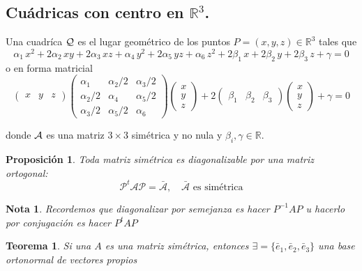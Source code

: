 \documentclass[11pt, a4paper, titlepage]{article}
\theoremstyle{theorem-style}
\newtheorem*{nth}{Teorema}
\newtheorem*{nprop}{Proposición}
\theoremstyle{definition-style}
\theoremstyle{remark-style}
\newtheorem*{nota}{Nota}
\theoremstyle{example-style}
\begin{document}
\subsection{Cu\'adricas con centro en $\mathbb{R}^3$.}


Una cuadr\'ica  $\cal Q$ es el lugar geom\'etrico de los puntos $P=(x,y,z)\in\mathbb{R}^3$ tales que
\[ 
\alpha_1 \,x^2 + 2\alpha_2 \,x y + 2\alpha_3\,x z + \alpha_4 \,y^2 + 2 \alpha_5 \,y z + \alpha_6 \,z^2 
+ 2\beta_1 \,x+ 2\beta_2 \,y +2 \beta_3 \,z + \gamma = 0
\]
o en forma matricial 
\[  
\left( \begin{array}{ccc} 
x & y & z   
 \end{array} \right)\begin{pmatrix}
 \alpha_1 & \alpha_2 / 2 &\alpha_3 / 2\\
 \alpha_2 / 2 & \alpha_4 &\alpha_5 / 2\\
 \alpha_3 / 2& \alpha_5 / 2& \alpha_6
\end{pmatrix} 
\left(\begin{array}{c}
x \\
y \\
z
\end{array} \right)
+
 2\left( \begin{array}{ccc}
\beta_1 & \beta_2 & \beta_3   
 \end{array} \right)
\left( \begin{array}{c}
x \\
y \\
z
 \end{array} \right)
+ \gamma = 0
\]

donde $\cal A$ es una matriz $3\times 3$ sim\'etrica y no nula y $\beta_i, \gamma\in\mathbb{R}$. 

\begin{nprop}
	Toda matriz simétrica es diagonalizable por una matriz ortogonal:
	\[
	\mathcal P ^t \mathcal A \mathcal P = \bar{ \mathcal A}, \quad \text{$\bar{\mathcal A}$ es simétrica}
	\]
\end{nprop}
\begin{nota}
	Recordemos que diagonalizar por semejanza es hacer $P^{-1}AP$ u hacerlo por conjugación es hacer $P^t A P$
\end{nota}

\begin{nth}
	Si una $A$ es una matriz simétrica, entonces $\exists = \{\bar e_1, \bar e_2, \bar e_3\}$ una base ortonormal de vectores propios
\end{nth}
\end{document}
